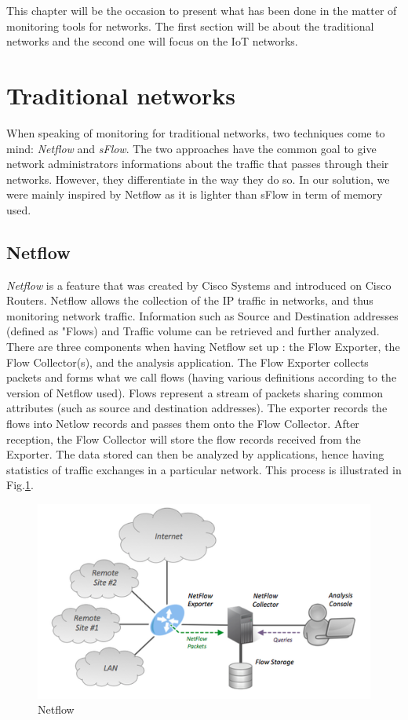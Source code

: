 This chapter will be the occasion to present what has been done in the matter of monitoring tools for networks. The first section will be about the traditional networks and the second one will focus on the IoT networks.

\section{Traditional networks}

When speaking of monitoring for traditional networks, two techniques come to mind: \textit{Netflow} and \textit{sFlow}. The two approaches have the common goal to give network administrators informations about the traffic that passes through their networks. However, they differentiate in the way they do so. In our solution, we were mainly inspired by Netflow as it is lighter than sFlow in term of memory used.

\subsection{Netflow}

\textit{Netflow} is a feature that was created by Cisco Systems and introduced on Cisco Routers. Netflow allows the collection of the IP traffic in networks, and thus monitoring network traffic. Information such as Source and Destination addresses (defined as "Flows) and Traffic volume can be retrieved and further analyzed.\\

There are three components when having Netflow set up : the Flow Exporter, the Flow Collector(s), and the analysis application. The Flow Exporter collects packets and forms what we call flows (having various definitions according to the version of Netflow used). Flows represent a stream of packets sharing common attributes (such as source and destination addresses). The exporter records the flows into Netlow records and passes them onto the Flow Collector. After reception, the Flow Collector will store the flow records received from the Exporter. The data stored can then be analyzed by applications, hence having statistics of traffic exchanges in a particular network. This process is illustrated in Fig.\ref{fig:netflow}.\\

\begin{figure}
  \centering
  \includegraphics[width=\textwidth]{res/netflow.png}
  \caption{Netflow}
  \label{fig:netflow}
\end{figure}

